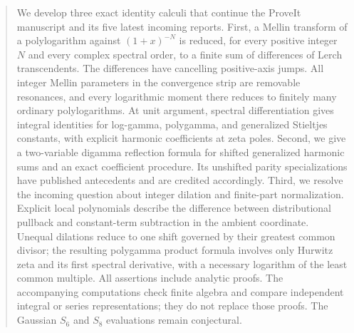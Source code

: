 \begin{abstract}
We develop three exact identity calculi that continue the ProveIt manuscript and its five latest incoming reports. First, a Mellin transform of a polylogarithm against $(1+x)^{-N}$ is reduced, for every positive integer $N$ and every complex spectral order, to a finite sum of differences of Lerch transcendents. The differences have cancelling positive-axis jumps. All integer Mellin parameters in the convergence strip are removable resonances, and every logarithmic moment there reduces to finitely many ordinary polylogarithms. At unit argument, spectral differentiation gives integral identities for log-gamma, polygamma, and generalized Stieltjes constants, with explicit harmonic coefficients at zeta poles. Second, we give a two-variable digamma reflection formula for shifted generalized harmonic sums and an exact coefficient procedure. Its unshifted parity specializations have published antecedents and are credited accordingly. Third, we resolve the incoming question about integer dilation and finite-part normalization. Explicit local polynomials describe the difference between distributional pullback and constant-term subtraction in the ambient coordinate. Unequal dilations reduce to one shift governed by their greatest common divisor; the resulting polygamma product formula involves only Hurwitz zeta and its first spectral derivative, with a necessary logarithm of the least common multiple. All assertions include analytic proofs. The accompanying computations check finite algebra and compare independent integral or series representations; they do not replace those proofs. The Gaussian $S_6$ and $S_8$ evaluations remain conjectural.
\end{abstract}
